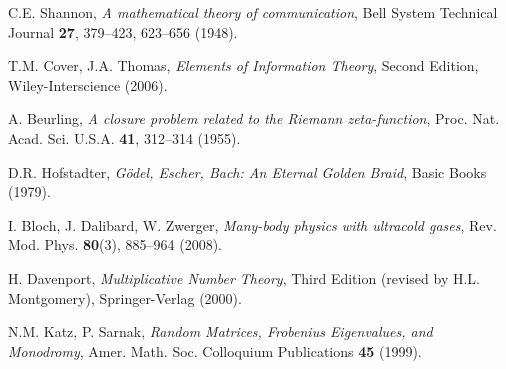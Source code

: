 \documentclass[12pt]{article}
\theoremstyle{plain}
\theoremstyle{definition}
\begin{document}
\begin{thebibliography}{99}
 C.E. Shannon, \emph{A mathematical theory of communication}, Bell System Technical Journal \textbf{27}, 379--423, 623--656 (1948).

 T.M. Cover, J.A. Thomas, \emph{Elements of Information Theory}, Second Edition, Wiley-Interscience (2006).

 A. Beurling, \emph{A closure problem related to the Riemann zeta-function}, Proc. Nat. Acad. Sci. U.S.A. \textbf{41}, 312--314 (1955).

 D.R. Hofstadter, \emph{Gödel, Escher, Bach: An Eternal Golden Braid}, Basic Books (1979).

 I. Bloch, J. Dalibard, W. Zwerger, \emph{Many-body physics with ultracold gases}, Rev. Mod. Phys. \textbf{80}(3), 885--964 (2008).

 H. Davenport, \emph{Multiplicative Number Theory}, Third Edition (revised by H.L. Montgomery), Springer-Verlag (2000).

 N.M. Katz, P. Sarnak, \emph{Random Matrices, Frobenius Eigenvalues, and Monodromy}, Amer. Math. Soc. Colloquium Publications \textbf{45} (1999).

\end{thebibliography}
\end{document}
